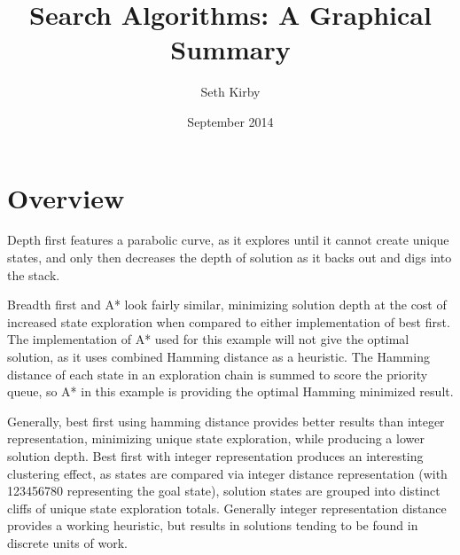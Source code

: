 \documentclass{article}
\title{Search Algorithms: A Graphical Summary}
\author{Seth Kirby}
\date{September 2014}
\begin{document}
\maketitle

\section{Overview}
\noindent%
\begin{minipage}{\linewidth}
\label{visina8}
\end{minipage}

Depth first features a parabolic curve, as it explores until it cannot create unique states, and only then decreases the depth of solution as it backs out and digs into the stack.

Breadth first and A* look fairly similar, minimizing solution depth at the cost of increased state exploration when compared to either implementation of best first.  The implementation of A* used for this example will not give the optimal solution, as it uses combined Hamming distance as a heuristic.  The Hamming distance of each state in an exploration chain is summed to score the priority queue, so A* in this example is providing the optimal Hamming minimized result.

Generally, best first using hamming distance provides better results than integer representation, minimizing unique state exploration, while producing a lower solution depth.  Best first with integer representation produces an interesting clustering effect, as states are compared via integer distance representation (with 123456780 representing the goal state), solution states are grouped into distinct cliffs of unique state exploration totals.  Generally integer representation distance provides a working heuristic, but results in solutions tending to be found in discrete units of work.
\end{document}
